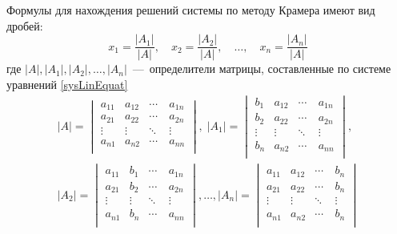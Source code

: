 \documentclass[14pt,a4paper]{article}
\begin{document}
Формулы для нахождения решений системы по методу Крамера имеют вид
дробей: 
\[ x_1 = \frac{|A_1|}{|A|}, \quad  x_2 =\frac{|A_2|}{|A|}, \quad \ldots, \quad x_n = \frac{|A_n|}{|A|}\]
где $|A|, |A_1|, |A_2|, \ldots, |A_n|$~---~определители матрицы, составленные по системе уравнений \ref{sysLinEquat}
\begin{equation}
    \begin{aligned}
        |A|=
        \begin{vmatrix}
            a_{11} & a_{12}  & \cdots   & a_{1n}   \\
            a_{21} & a_{22}  & \cdots   & a_{2n}  \\
            \vdots & \vdots  & \ddots   & \vdots  \\
            a_{n1} & a_{n2}  & \cdots\  & a_{nn}  \\
        \end{vmatrix}, \;
    |A_1|=
    \begin{vmatrix}
        b_{1} & a_{12}  & \cdots   & a_{1n}   \\
        b_{2} & a_{22}  & \cdots   & a_{2n}  \\
        \vdots & \vdots  & \ddots   & \vdots  \\
        b_{n} & a_{n2}  & \cdots\  & a_{nn}  \\
    \end{vmatrix}, \\
    |A_2|=
    \begin{vmatrix}
        a_{11} & b_{1}  & \cdots   & a_{1n}   \\
        a_{21} & b_{2}  & \cdots   & a_{2n}  \\
        \vdots & \vdots  & \ddots   & \vdots  \\
        a_{n1} & b_{n}  & \cdots\  & a_{nn}  \\
    \end{vmatrix}, \ldots ,  
    |A_n|=
    \begin{vmatrix}
        a_{11} & a_{12}  & \cdots   & b_{n}   \\
        a_{21} & a_{22}  & \cdots   & b_{n}  \\
        \vdots & \vdots  & \ddots   & \vdots  \\
        a_{n1} & a_{n2}  & \cdots\  & b_{n}  \\
    \end{vmatrix}
\end{aligned}
\end{equation}
\end{document}

